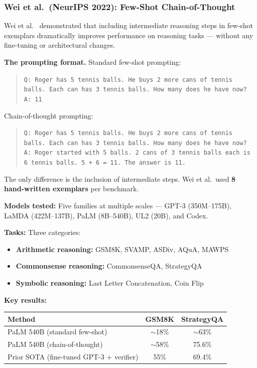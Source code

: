 \documentclass[11pt, a4paper]{article}
\theoremstyle{definition}
\theoremstyle{plain}
\begin{document}
\subsubsection{Wei et al.\ (NeurIPS 2022): Few-Shot Chain-of-Thought}

Wei et al.~\cite{wei2022cot} demonstrated that including intermediate reasoning steps in few-shot exemplars dramatically improves performance on reasoning tasks --- without any fine-tuning or architectural changes.

\textbf{The prompting format.} Standard few-shot prompting:
\begin{quote}
\texttt{Q: Roger has 5 tennis balls. He buys 2 more cans of tennis balls. Each can has 3 tennis balls. How many does he have now?}\\
\texttt{A: 11}
\end{quote}

Chain-of-thought prompting:
\begin{quote}
\texttt{Q: Roger has 5 tennis balls. He buys 2 more cans of tennis balls. Each can has 3 tennis balls. How many does he have now?}\\
\texttt{A: Roger started with 5 balls. 2 cans of 3 tennis balls each is 6 tennis balls. 5 + 6 = 11. The answer is 11.}
\end{quote}

The only difference is the inclusion of intermediate steps. Wei et al.\ used \textbf{8 hand-written exemplars} per benchmark.

\textbf{Models tested:} Five families at multiple scales --- GPT-3 (350M--175B), LaMDA (422M--137B), PaLM (8B--540B), UL2 (20B), and Codex.

\textbf{Tasks:} Three categories:
\begin{itemize}
  \item \textbf{Arithmetic reasoning:} GSM8K, SVAMP, ASDiv, AQuA, MAWPS
  \item \textbf{Commonsense reasoning:} CommonsenseQA, StrategyQA
  \item \textbf{Symbolic reasoning:} Last Letter Concatenation, Coin Flip
\end{itemize}

\textbf{Key results:}
\begin{center}
\begin{tabular}{lcc}
  \toprule
  \textbf{Method} & \textbf{GSM8K} & \textbf{StrategyQA} \\
  \midrule
  PaLM 540B (standard few-shot) & ${\sim}$18\% & ${\sim}$63\% \\
  PaLM 540B (chain-of-thought) & ${\sim}$58\% & 75.6\% \\
  Prior SOTA (fine-tuned GPT-3 + verifier) & 55\% & 69.4\% \\
  \bottomrule
\end{tabular}
\end{center}
\end{document}
